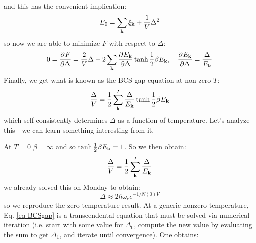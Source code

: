 and this has the convenient implication:
\begin{equation}
    E_0 = \sum_{\mathbf{k}}\xi_{\mathbf{k}} + \frac{1}{V}\Delta^2
\end{equation}
so now we are able to minimize $F$ with respect to $\Delta$:
\begin{equation}
    0 = \dpd{F}{\Delta} = \frac{2}{V}\Delta - 2\sum_{\v{k}}\dpd{E_\v{k}}{\Delta}\tanh\frac{1}{2}\beta E_{\v{k}}, \quad \dpd{E_{\v{k}}}{\Delta} = \frac{\Delta}{E_{\v{k}}}
\end{equation}
Finally, we get what is known as the BCS gap equation at non-zero $T$:
\begin{equation}\label{eq-BCSgap}
    \frac{\Delta}{V} = \frac{1}{2}\sum_{\mathbf{k}}'\frac{\Delta}{E_{\mathbf{k}}}\tanh\frac{1}{2}\beta E_{\mathbf{k}}
\end{equation}
which self-consistently determines $\Delta$ as a function of temperature. Let's analyze this - we can learn something interesting from it.

At $T = 0$ $\beta = \infty$ and so $\tanh \frac{1}{2}\beta E_{\mathbf{k}} = 1$. So we then obtain:
\begin{align*}
    \frac{\Delta}{V} = \frac{1}{2}\sum_{\mathbf{k}}'\frac{\Delta}{E_{\mathbf{k}}}
\end{align*} 
we already solved this on Monday to obtain:
\begin{equation}\label{eq-Delta0}
    \Delta \approx 2\hbar \omega_c e^{-1/N(0)V}
\end{equation}
so we reproduce the zero-temperature result. At a generic nonzero temperature, Eq. \eqref{eq-BCSgap} is a transcendental equation that must be solved via numerical iteration (i.e. start with some value for $\Delta_0$, compute the new value by evaluating the sum to get $\Delta_1$, and iterate until convergence). One obtains:

